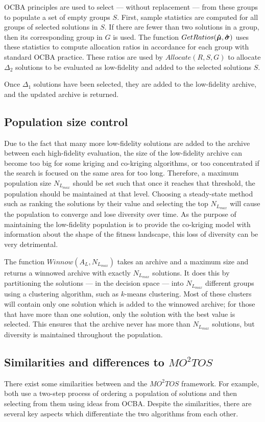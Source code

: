 OCBA principles are used to select --- without replacement --- from these groups to populate a set of empty groups $S$. First, sample statistics are computed for all groups of selected solutions in $S$. If there are fewer than two solutions in a group, then its corresponding group in $G$ is used. The function $GetRatios(\boldsymbol{\hat{\mu}},\boldsymbol{\hat{\sigma}})$ uses these statistics to compute allocation ratios in accordance for each group with standard OCBA practice. These ratios are used by $Allocate(R,S,G)$ to allocate $\Delta_2$ solutions to be evaluated as low-fidelity and added to the selected solutions $S$.

Once $\Delta_1$ solutions have been selected, they are added to the low-fidelity archive, and the updated archive is returned.

\subsection{Population size control}
Due to the fact that many more low-fidelity solutions are added to the archive between each high-fidelity evaluation, the size of the low-fidelity archive can become too big for some kriging and co-kriging algorithms, or too concentrated if the search is focused on the same area for too long. Therefore, a maximum population size $N_{L_{max}}$ should be set such that once it reaches that threshold, the population should be maintained at that level. Choosing a steady-state method such as ranking the solutions by their value and selecting the top $N_{L_{max}}$ will cause the population to converge and lose diversity over time. As the purpose of maintaining the low-fidelity population is to provide the co-kriging model with information about the shape of the fitness landscape, this loss of diversity can be very detrimental. 

The function $Winnow(A_L,N_{L_{max}})$ takes an archive and a maximum size and returns a winnowed archive with exactly $N_{L_{max}}$ solutions. It does this by partitioning the solutions --- in the decision space --- into $N_{L_{max}}$ different groups using a clustering algorithm, such as $k$-means clustering. Most of these clusters will contain only one solution which is added to the winnowed archive; for those that have more than one solution, only the solution with the best value is selected. This ensures that the archive never has more than $N_{L_{max}}$ solutions, but diversity is maintained throughout the population.

\subsection{Similarities and differences to $MO^2TOS$}
There exist some similarities between \AlgName{} and the $MO^2TOS$ framework. For example, both use a two-step process of ordering a population of solutions and then selecting from them using ideas from OCBA. Despite the similarities, there are several key aspects which differentiate the two algorithms from each other. 

